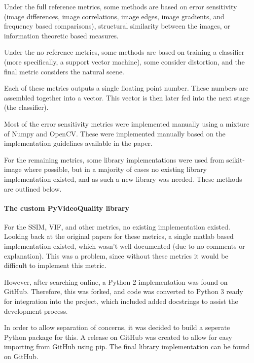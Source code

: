 \documentclass[10pt,a4paper]{article}
\begin{document}
            Under the full reference metrics, some methods are based on error sensitivity (image differences, image correlations, image edges, image gradients, and frequency based comparisons),
            structural similarity between the images, or information theoretic based measures.

            Under the no reference metrics, some methods are based on training a classifier (more specifically, a support vector machine), some consider distortion, and the final metric considers the natural scene.
            
            Each of these metrics outputs a single floating point number. These numbers are assembled together into a vector. This vector is then later fed into the next stage (the classifier).

            Most of the error sensitivity metrics were implemented manually using a mixture of Numpy and OpenCV. These were implemented manually based on the implementation guidelines available in the paper.

            For the remaining metrics, some library implementations were used from scikit-image where possible, but in a majority of cases no existing library implementation existed, and as such a new library
            was needed. These methods are outlined below.

            \paragraph{The custom PyVideoQuality library}
            For the SSIM, VIF, and other metrics, no existing implementation existed. Looking back at the original papers for these metrics, a single matlab based implementation existed, which wasn't well documented (due to no comments or
            explanation). This was a problem, since without these metrics it would be difficult to implement this metric.
            
            However, after searching online, a Python 2 implementation was found on GitHub. \cite{VideoQualityOriginal} Therefore, this was forked, and code was converted to Python 3 ready for integration into the project, which included added docstrings to assist the development process. 
            
            In order to allow separation of concerns, it was decided to build a seperate Python package for this. A release on GitHub was created to allow for easy importing from GitHub using pip. The final library implementation can be found on GitHub. \cite{VideoQualityUpdated}
\end{document}
